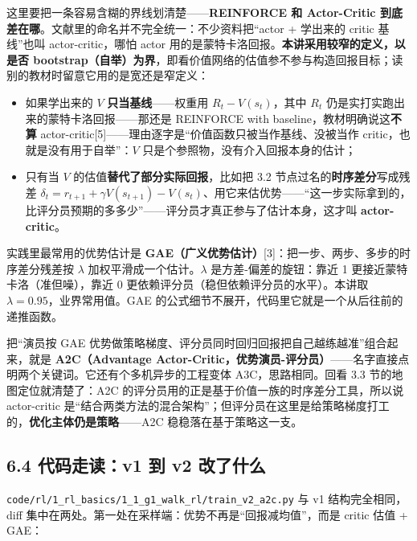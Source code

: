 \documentclass[
  chinese,
]{ctexart}
\providecommand{\tightlist}{%
  \setlength{\itemsep}{0pt}\setlength{\parskip}{0pt}}
\begin{document}
这里要把一条容易含糊的界线划清楚------\textbf{REINFORCE 和 Actor-Critic
到底差在哪}。文献里的命名并不完全统一：不少资料把``actor + 学出来的
critic 基线''也叫 actor-critic，哪怕 actor
用的是蒙特卡洛回报。\textbf{本讲采用较窄的定义，以是否
bootstrap（自举）为界}，即看价值网络的估值参不参与构造回报目标；读别的教材时留意它用的是宽还是窄定义：

\begin{itemize}
\tightlist
\item
  如果学出来的 \(V\) \textbf{只当基线}------权重用
  \(R_t - V(s_t)\)，其中 \(R_t\)
  仍是实打实跑出来的蒙特卡洛回报------那还是 REINFORCE with
  baseline，教材明确说这\textbf{不算}
  actor-critic{[}5{]}------理由逐字是``价值函数只被当作基线、没被当作
  critic，也就是没有用于自举''：\(V\)
  只是个参照物，没有介入回报本身的估计；
\item
  只有当 \(V\) 的估值\textbf{替代了部分实际回报}，比如把 3.2
  节点过名的\textbf{时序差分}写成残差
  \(\delta_t = r_{t+1} + \gamma V(s_{t+1}) - V(s_t)\)、用它来估优势------``这一步实际拿到的，比评分员预期的多多少''------评分员才真正参与了估计本身，这才叫
  \textbf{actor-critic}。
\end{itemize}

实践里最常用的优势估计是
\textbf{GAE（广义优势估计）}{[}3{]}：把一步、两步、多步的时序差分残差按
\(\lambda\) 加权平滑成一个估计。\(\lambda\) 是方差-偏差的旋钮：靠近 1
更接近蒙特卡洛（准但噪），靠近 0
更依赖评分员（稳但依赖评分员的水平）。本讲取
\(\lambda=0.95\)，业界常用值。GAE
的公式细节不展开，代码里它就是一个从后往前的递推函数。

把``演员按 GAE
优势做策略梯度、评分员同时回归回报把自己越练越准''组合起来，就是
\textbf{A2C（Advantage
Actor-Critic，优势演员-评分员）}------名字直接点明两个关键词。它还有个多机异步的工程变体
A3C，思路相同。回看 3.3 节的地图定位就清楚了：A2C
的评分员用的正是基于价值一族的时序差分工具，所以说 actor-critic
是``结合两类方法的混合架构''；但评分员在这里是给策略梯度打工的，\textbf{优化主体仍是策略}------A2C
稳稳落在基于策略这一支。

\subsection{6.4 代码走读：v1 到 v2
改了什么}\label{ux4ee3ux7801ux8d70ux8bfbv1-ux5230-v2-ux6539ux4e86ux4ec0ux4e48}

\texttt{code/rl/1\_rl\_basics/1\_1\_g1\_walk\_rl/train\_v2\_a2c.py} 与
v1 结构完全相同，diff
集中在两处。第一处在采样端：优势不再是``回报减均值''，而是 critic 估值 +
GAE：
\end{document}
